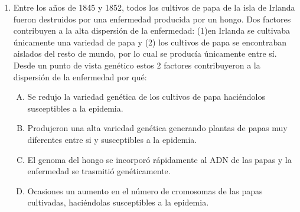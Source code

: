 \begin{enumerate}
\begin{center}
\texttt{[image: bio\_12.jpg]} 
\end{center}
Según los resultados anteriores,  a  que corresponde   cada  una de las zonas en la gráfica: 

\begin{enumerate}[(A)]
\item Zona 1: Océano.   Zona 2: Bosque. Zona 3: Rular.    Zona 4: Fabricas.
\item Zona 1: Bosque.   Zona 2: Rural.  Zona 3: Fabricas. Zona 4: Océano.
\item Zona 1: Fabricas. Zona 2: Rural.  Zona 3: Bosque.   Zona 4: Oceano.
\item Zona 1: Bosque.   Zona 2: Océano. Zona 3: Rural.    Zona 4: Fabric.
\end{enumerate}


\newpage
\item Entre  los  años  de  1845 y 1852, todos  los  cultivos  de papa  de  la isla de  Irlanda  fueron   destruidos por  una enfermedad  producida por un  hongo. Dos factores  contribuyen  a la  alta  dispersión de  la  enfermedad: \label{bio-20}
(1)en Irlanda  se cultivaba únicamente una variedad de papa y (2) los  cultivos  de papa  se  encontraban aislados del resto de  mundo, por lo  cual se producía únicamente entre sí.
Desde un punto de  vista genético estos  2  factores contribuyeron  a la dispersión de la enfermedad por qué:
\begin{enumerate}[(A)]
\item Se  redujo  la variedad  genética de los cultivos  de papa  haciéndolos susceptibles a la epidemia.
\item Produjeron una alta  variedad  genética  generando plantas  de  papas  muy  diferentes entre  si  y  susceptibles  a la epidemia.
\item El genoma     del  hongo  se incorporó rápidamente  al  ADN  de las papas y la enfermedad  se trasmitió genéticamente.
\item Ocasiones  un   aumento  en  el número  de  cromosomas  de  las  papas  cultivadas, haciéndolas    susceptibles  a   la  epidemia.
\end{enumerate}


\end{enumerate}
